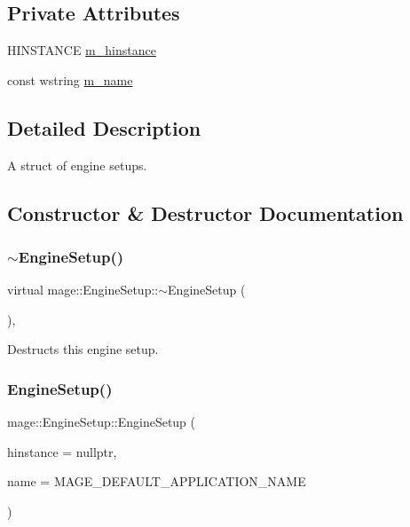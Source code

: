 \subsection*{Private Attributes}
\begin{DoxyCompactItemize}
\item 
H\+I\+N\+S\+T\+A\+N\+CE \hyperlink{structmage_1_1_engine_setup_af91461305cd9aa60e22fa770395d2238}{m\+\_\+hinstance}
\item 
const wstring \hyperlink{structmage_1_1_engine_setup_a40fba981d4b1c30eff304b029a013009}{m\+\_\+name}
\end{DoxyCompactItemize}


\subsection{Detailed Description}
A struct of engine setups. 

\subsection{Constructor \& Destructor Documentation}
\hypertarget{structmage_1_1_engine_setup_a77de1ad7e922dec4791b558d20616b08}{}\label{structmage_1_1_engine_setup_a77de1ad7e922dec4791b558d20616b08} 
\subsubsection{\texorpdfstring{$\sim$\+Engine\+Setup()}{~EngineSetup()}}
{\footnotesize\ttfamily virtual mage\+::\+Engine\+Setup\+::$\sim$\+Engine\+Setup (\begin{DoxyParamCaption}{ }\end{DoxyParamCaption})\hspace{0.3cm}{\ttfamily [virtual]}, {\ttfamily [default]}}

Destructs this engine setup. \hypertarget{structmage_1_1_engine_setup_a5a19cf91bfd8cea940abbbbbdd1828a1}{}\label{structmage_1_1_engine_setup_a5a19cf91bfd8cea940abbbbbdd1828a1} 
\subsubsection{\texorpdfstring{Engine\+Setup()}{EngineSetup()}\hspace{0.1cm}{\footnotesize\ttfamily [1/2]}}
{\footnotesize\ttfamily mage\+::\+Engine\+Setup\+::\+Engine\+Setup (\begin{DoxyParamCaption}\item[{H\+I\+N\+S\+T\+A\+N\+CE}]{hinstance = {\ttfamily nullptr},  }\item[{const wstring \&}]{name = {\ttfamily MAGE\+\_\+DEFAULT\+\_\+APPLICATION\+\_\+NAME} }\end{DoxyParamCaption})\hspace{0.3cm}{\ttfamily [protected]}}

